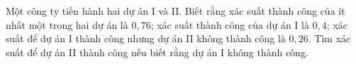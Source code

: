 \begin{ex}
Một công ty tiến hành hai dự án I và II. Biết rằng xác suất thành công của ít nhất một trong hai dự án là $0{,}76$; xác suất thành công của dự án I là $0{,}4$; xác suất để dự án I thành công nhưng dự án II không thành công là $0{,}26$. Tìm xác suất để dự án II thành công nếu biết rằng dự án I không thành công.
\end{ex}
